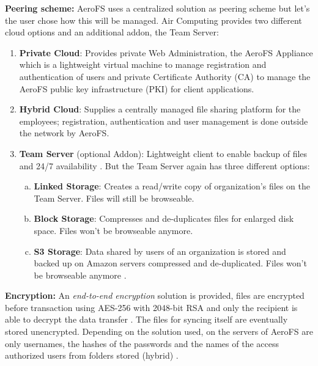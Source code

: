 \textbf{Peering scheme:} AeroFS uses a centralized solution as peering scheme but let's the user chose how this will be managed. Air Computing provides two different cloud options and an additional addon, the Team Server:

\begin{enumerate}
\item \textbf{Private Cloud}: Provides private Web Administration, the AeroFS Appliance which is a lightweight virtual machine to manage registration and authentication of users and private Certificate Authority (CA) to manage the AeroFS public key infrastructure (PKI) for client applications.
\item \textbf{Hybrid Cloud}: Supplies a centrally managed file sharing platform for the employees; registration, authentication and user management is done outside the network by AeroFS.
\item \textbf{Team Server} (optional Addon): Lightweight client to enable backup of files and 24/7 availability \cite{aerofs:cloud_types}. But the Team Server again has three different options:
	\begin{enumerate}[(a)]
	\item \textbf{Linked Storage}: Creates a read/write copy of organization's files on the Team Server. Files will still be browseable.
	\item \textbf{Block Storage}: Compresses and de-duplicates files for enlarged disk space. Files won't be browseable anymore.
	\item \textbf{S3 Storage}: Data shared by users of an organization is stored and backed up on Amazon servers compressed and de-duplicated. Files won't be browseable anymore \cite{aerofs:storage_types}.
	\end{enumerate}
\end{enumerate}

\textbf{Encryption:} An \textit{end-to-end encryption} solution is provided, files are encrypted before transaction using AES-256 with 2048-bit RSA and only the recipient is able to decrypt the data transfer \cite{aerofs:security}. The files for syncing itself are eventually stored unencrypted. Depending on the solution used, on the servers of AeroFS are only usernames, the hashes of the passwords and the names of the access authorized users from folders stored (hybrid) \cite{aerofs:security_2}.

